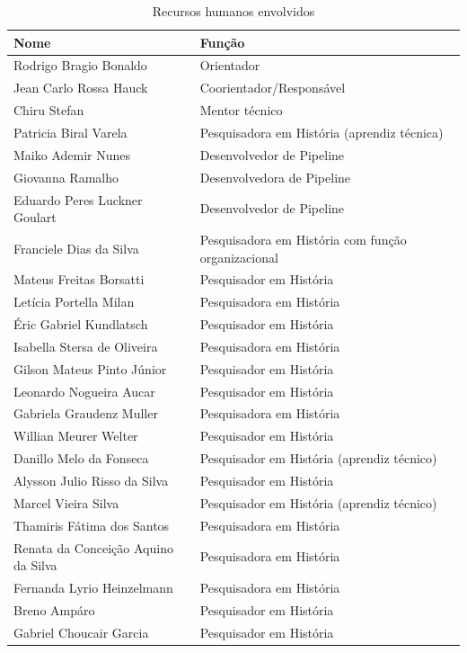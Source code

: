 \begin{table}[htbp]
  \small
  \caption{Recursos humanos envolvidos}           %
  \label{tab:rh}
  \centering
  \begin{tabularx}{\linewidth}{@{}>{\RaggedRight\arraybackslash}p{5.5cm}
                                    >{\RaggedRight\arraybackslash}X@{}}
    \toprule
    Nome & Função \\ \midrule
    Rodrigo Bragio Bonaldo & Orientador \\
    Jean Carlo Rossa Hauck & Coorientador/Responsável \\
    Chiru Stefan & Mentor técnico \\
    Patricia Biral Varela & Pesquisadora em História (aprendiz técnica) \\
    Maiko Ademir Nunes & Desenvolvedor de Pipeline \\
    Giovanna Ramalho & Desenvolvedora de Pipeline \\
    Eduardo Peres Luckner Goulart & Desenvolvedor de Pipeline \\
    Franciele Dias da Silva & Pesquisadora em História com função
    organizacional \\
    Mateus Freitas Borsatti & Pesquisador em História \\
    Letícia Portella Milan & Pesquisadora em História \\
    Éric Gabriel Kundlatsch & Pesquisador em História \\
    Isabella Stersa de Oliveira & Pesquisadora em História \\
    Gilson Mateus Pinto Júnior & Pesquisador em História \\
    Leonardo Nogueira Aucar & Pesquisador em História \\
    Gabriela Graudenz Muller & Pesquisadora em História \\
    Willian Meurer Welter & Pesquisador em História \\
    Danillo Melo da Fonseca & Pesquisador em História (aprendiz técnico) \\
    Alysson Julio Risso da Silva & Pesquisador em História \\
    Marcel Vieira Silva & Pesquisador em História (aprendiz técnico) \\
    Thamiris Fátima dos Santos & Pesquisadora em História \\
    Renata da Conceição Aquino da Silva & Pesquisadora em História \\
    Fernanda Lyrio Heinzelmann & Pesquisadora em História \\
    Breno Ampáro & Pesquisador em História \\
    Gabriel Choucair Garcia & Pesquisador em História \\ \bottomrule
  \end{tabularx}
\end{table}

